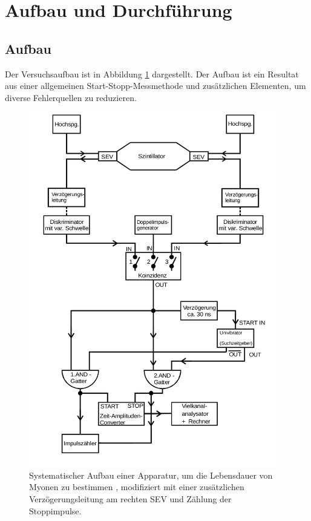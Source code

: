 \section{Aufbau und Durchführung}
\subsection{Aufbau}
\label{sec:Aufbau}

Der Versuchsaufbau ist in Abbildung \ref{fig:aufbau1} dargestellt.
Der Aufbau ist ein Resultat aus einer allgemeinen Start-Stopp-Messmethode und zusätzlichen Elementen, um diverse Fehlerquellen zu reduzieren.\\

\begin{figure}
  \centering
  \includegraphics[height=15.5cm]{ressources/aufbau.jpeg}
  \caption{Systematischer Aufbau einer Apparatur, um die Lebensdauer von Myonen zu bestimmen \cite{skript}, modifiziert mit einer zusätzlichen Verzögerungsleitung am rechten SEV und Zählung der Stoppimpulse.}
  \label{fig:aufbau1}
\end{figure}



